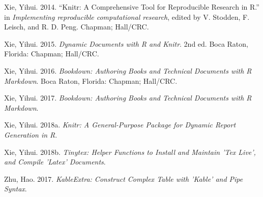 \documentclass[
  12pt,
]{article}
\begin{document}
\leavevmode\hypertarget{ref-knitr3}{}%
Xie, Yihui. 2014. ``Knitr: A Comprehensive Tool for Reproducible Research in R.'' in \emph{Implementing reproducible computational research}, edited by V. Stodden, F. Leisch, and R. D. Peng. Chapman; Hall/CRC.

\leavevmode\hypertarget{ref-knitr2}{}%
Xie, Yihui. 2015. \emph{Dynamic Documents with R and Knitr}. 2nd ed. Boca Raton, Florida: Chapman; Hall/CRC.

\leavevmode\hypertarget{ref-bookdown2}{}%
Xie, Yihui. 2016. \emph{Bookdown: Authoring Books and Technical Documents with R Markdown}. Boca Raton, Florida: Chapman; Hall/CRC.

\leavevmode\hypertarget{ref-bookdown1}{}%
Xie, Yihui. 2017. \emph{Bookdown: Authoring Books and Technical Documents with R Markdown}.

\leavevmode\hypertarget{ref-knitr1}{}%
Xie, Yihui. 2018a. \emph{Knitr: A General-Purpose Package for Dynamic Report Generation in R}.

\leavevmode\hypertarget{ref-tinytex}{}%
Xie, Yihui. 2018b. \emph{Tinytex: Helper Functions to Install and Maintain 'Tex Live', and Compile 'Latex' Documents}.

\leavevmode\hypertarget{ref-kableextra}{}%
Zhu, Hao. 2017. \emph{KableExtra: Construct Complex Table with 'Kable' and Pipe Syntax}.
\end{document}
